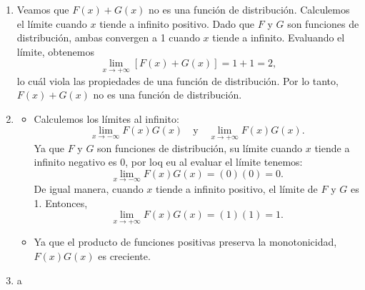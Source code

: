 \documentclass{article}
\begin{document}
\begin{enumerate}
\begin{enumerate}[label={(\roman*)}]
        Consideremos \(a \in (0, 1)\) y verifiquemos las propiedades de la función.
        \begin{itemize}
            \item Calculemos los límites al infinito: 
            \[
            \lim_{x \to -\infty} aF(x) + (1 - a)G(x) \quad \text{y} \lim_{x \to +\infty} aF(x) + (1 - a)G(x).
            \]
            Ya que \(F\) y \(G\) son funciones de distribución, su límite cuando \(x\) tiende a infinito negativo es 0, por lo que al evaluar el límite tenemos:
            \[
            \lim_{x \to -\infty} aF(x) + (1 - a)G(x) = a(0) + (1 - a)(0) = 0.
            \]
            Análogamente, cuando \(x\) tiende a infinito positivo, el límite de \(F\) y \(G\) es 1. Por lo tanto,
            \[
            \lim_{x \to +\infty} aF(x) + (1 - a)G(x) = a(1) + (1 - a)(1) = a + 1 - a = 1.
            \]
            \item Dado que \(a \geq 0\), entonces la monotonicidad del primer término \(aF(x)\) es igual a la de \(F(x)\), que es creciente por hipótesis. De forma similar, como \(a \leq 1\), entonces \((1 - a) \geq 0\) y el término \((1 - a)G(x)\) también es creciente. Como la suma de funciones crecientes también es creciente, se sigue que la función \(aF(x) + (1 - a)G(x)\) es creciente.
            \item Ya que hemos probado que la función es creciente y su valor en sus límites es 0 y 1, se sigue que 
            \[
            0 \leq aF(x) + (1 - a)G(x) \leq 1.
            \]
        \end{itemize}
        Como hemos verificado las propiedades, entonces la función \(aF(x) + (1 - a)G(x)\) es una función de distribución.
        \item Veamos que \(F(x) + G(x)\) no es una función de distribución. Calculemos el límite cuando \(x\) tiende a infinito positivo. Dado que \(F\) y \(G\) son funciones de distribución, ambas convergen a 1 cuando \(x\) tiende a infinito. Evaluando el límite, obtenemos 
    \[
    \lim_{x \to +\infty} [F(x) + G(x)] = 1 + 1 = 2,
    \]
    lo cuál viola las propiedades de una función de distribución. Por lo tanto, \(F(x) + G(x)\) no es una función de distribución.
    \item \begin{itemize}
        \item Calculemos los límites al infinito:
        \[
        \lim_{x \to -\infty}F(x)G(x) \quad \text{y} \quad \lim_{x \to +\infty} F(x)G(x).
        \]
        Ya que \(F\) y \(G\) son funciones de distribución, su límite cuando \(x\) tiende a infinito negativo es 0, por loq eu al evaluar el límite tenemos:
        \[
        \lim_{x \to -\infty}F(x)G(x) = (0)(0) = 0.
        \]
        De igual manera, cuando \(x\) tiende a infinito positivo, el límite de \(F\) y \(G\) es 1. Entonces,
        \[
        \lim_{x \to +\infty}F(x)G(x) = (1)(1) = 1.
        \]
        \item Ya que el producto de funciones positivas preserva la monotonicidad, \(F(x)G(x)\) es creciente.
    \end{itemize}
    \item a
\end{enumerate}
\end{enumerate}
\end{document}

